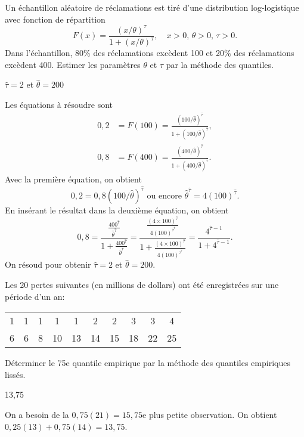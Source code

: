 \begin{exercice}
Un échantillon aléatoire de réclamations est tiré d'une distribution log-logistique avec fonction de répartition
$$
F(x)=\frac{(x/\theta)^\tau}{1+(x/\theta)^\tau}, \quad x>0, \, \theta >0, \, \tau >0.
$$
Dans l'échantillon, 80\% des réclamations excèdent 100 et 20\% des réclamations excèdent 400. Estimer les paramètres $\theta$ et $\tau$ par la méthode des quantiles.

\begin{rep}
$\hat{\tau}=2$ et $\hat{\theta}=200$
\end{rep}

\begin{sol}
Les équations à résoudre sont
\begin{align*}
0,2 &= F(100) = \frac{(100/\hat{\theta})^{\hat{\tau}}}{1+(100/\hat{\theta})^{\hat{\tau}}}, \\
0,8 &= F(400) = \frac{(400/\hat{\theta})^{\hat{\tau}}}{1+(400/\hat{\theta})^{\hat{\tau}}}.
\end{align*}
Avec la première équation, on obtient
$$
0,2=0,8(100/\hat{\theta})^{\hat{\tau}} \text{ ou encore } \hat{\theta}^{\hat{\tau}}=4(100)^{\hat{\tau}}. 
$$
En insérant le résultat dans la deuxième équation, on obtient
$$
0,8 = \frac{\frac{400^{\hat{\tau}}}{\hat{\theta}^{\hat{\tau}}}}{1+\frac{400^{\hat{\tau}}}{\hat{\theta}^{\hat{\tau}}}}
=\frac{\frac{(4 \times 100)^{\hat{\tau}}}{4(100)^{\hat{\tau}}^{\hat{\tau}}}}{1+\frac{(4 \times 100)^{\hat{\tau}}}{4(100)^{\hat{\tau}}^{\hat{\tau}}}}
= \frac{4^{\hat{\tau}-1}}{1+4^{\hat{\tau}-1}}.
$$
On résoud pour obtenir $\hat{\tau}=2$ et $\hat{\theta}=200$.
\end{sol}
\end{exercice}

\begin{exercice}
Les 20 pertes suivantes (en millions de dollars) ont été enregistrées sur une période d'un an:
\begin{center}
\begin{tabular}{cccccccccc}
1 & 1 & 1 & 1 & 1 & 2 & 2 & 3 & 3 & 4 \\
6 & 6 & 8 & 10 & 13 & 14 & 15 & 18 & 22 & 25
\end{tabular}
\end{center}
Déterminer le 75e quantile empirique par la méthode des quantiles empiriques lissés.

\begin{rep}
13,75
\end{rep}

\begin{sol}
On a besoin de la $0,75(21)=15,75$e plus petite observation. On obtient $0,25(13) + 0,75(14)= 13,75$.
\end{sol}
\end{exercice}

